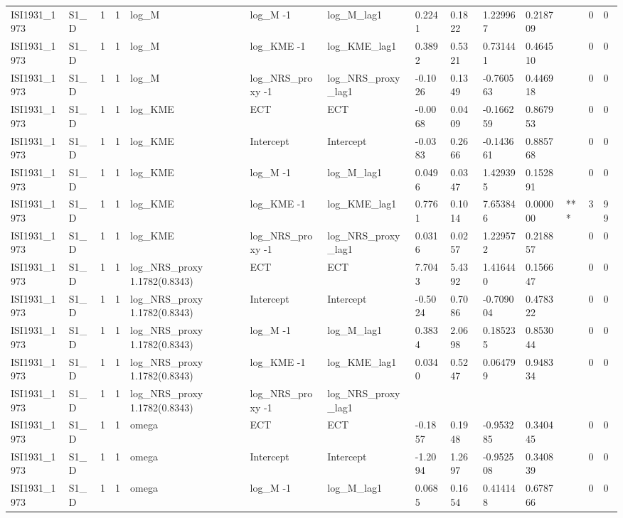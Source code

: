 \begin{tabular}{llllllllllllll}
ISI1931\_1973 & S1\_D & 1 & 1 & log\_M & log\_M -1 & log\_M\_lag1 & 0.2241 & 0.1822 & 1.229967 & 0.218709 &  & 0 & 0 \\
ISI1931\_1973 & S1\_D & 1 & 1 & log\_M & log\_KME -1 & log\_KME\_lag1 & 0.3892 & 0.5321 & 0.731441 & 0.464510 &  & 0 & 0 \\
ISI1931\_1973 & S1\_D & 1 & 1 & log\_M & log\_NRS\_proxy -1 & log\_NRS\_proxy\_lag1 & -0.1026 & 0.1349 & -0.760563 & 0.446918 &  & 0 & 0 \\
ISI1931\_1973 & S1\_D & 1 & 1 & log\_KME & ECT & ECT & -0.0068 & 0.0409 & -0.166259 & 0.867953 &  & 0 & 0 \\
ISI1931\_1973 & S1\_D & 1 & 1 & log\_KME & Intercept & Intercept & -0.0383 & 0.2666 & -0.143661 & 0.885768 &  & 0 & 0 \\
ISI1931\_1973 & S1\_D & 1 & 1 & log\_KME & log\_M -1 & log\_M\_lag1 & 0.0496 & 0.0347 & 1.429395 & 0.152891 &  & 0 & 0 \\
ISI1931\_1973 & S1\_D & 1 & 1 & log\_KME & log\_KME -1 & log\_KME\_lag1 & 0.7761 & 0.1014 & 7.653846 & 0.000000 & *** & 3 & 99 \\
ISI1931\_1973 & S1\_D & 1 & 1 & log\_KME & log\_NRS\_proxy -1 & log\_NRS\_proxy\_lag1 & 0.0316 & 0.0257 & 1.229572 & 0.218857 &  & 0 & 0 \\
ISI1931\_1973 & S1\_D & 1 & 1 & log\_NRS\_proxy 1.1782(0.8343) & ECT & ECT & 7.7043 & 5.4392 & 1.416440 & 0.156647 &  & 0 & 0 \\
ISI1931\_1973 & S1\_D & 1 & 1 & log\_NRS\_proxy 1.1782(0.8343) & Intercept & Intercept & -0.5024 & 0.7086 & -0.709004 & 0.478322 &  & 0 & 0 \\
ISI1931\_1973 & S1\_D & 1 & 1 & log\_NRS\_proxy 1.1782(0.8343) & log\_M -1 & log\_M\_lag1 & 0.3834 & 2.0698 & 0.185235 & 0.853044 &  & 0 & 0 \\
ISI1931\_1973 & S1\_D & 1 & 1 & log\_NRS\_proxy 1.1782(0.8343) & log\_KME -1 & log\_KME\_lag1 & 0.0340 & 0.5247 & 0.064799 & 0.948334 &  & 0 & 0 \\
ISI1931\_1973 & S1\_D & 1 & 1 & log\_NRS\_proxy 1.1782(0.8343) & log\_NRS\_proxy -1 & log\_NRS\_proxy\_lag1 &  &  &  &  &  &  &  \\
ISI1931\_1973 & S1\_D & 1 & 1 & omega & ECT & ECT & -0.1857 & 0.1948 & -0.953285 & 0.340445 &  & 0 & 0 \\
ISI1931\_1973 & S1\_D & 1 & 1 & omega & Intercept & Intercept & -1.2094 & 1.2697 & -0.952508 & 0.340839 &  & 0 & 0 \\
ISI1931\_1973 & S1\_D & 1 & 1 & omega & log\_M -1 & log\_M\_lag1 & 0.0685 & 0.1654 & 0.414148 & 0.678766 &  & 0 & 0 \\

\end{tabular}
